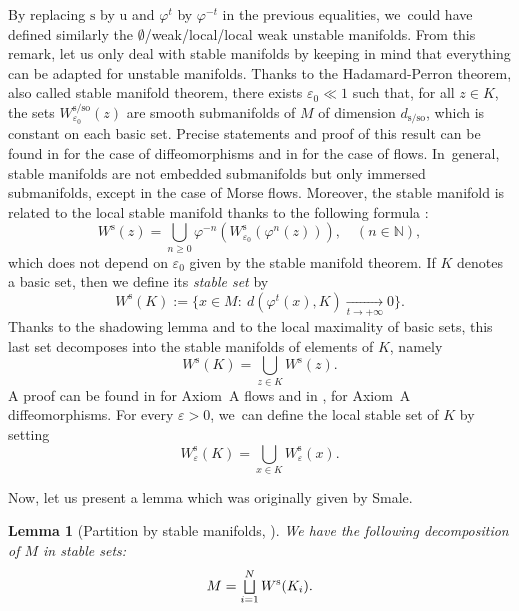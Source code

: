 \documentclass[JEP,XML,SOM,Unicode,NoEqCountersInSection,NoFloatCountersInSection,published]{cedram}
\let\oldbigsqcup\bigsqcup
\renewcommand{\bigsqcup}{\mathop{\textstyle\oldbigsqcup}\displaylimits}
\newcommand{\rs}{\mathrm{s}}
\newcommand{\rso}{\mathrm{so}}
\newcommand{\ru}{\mathrm{u}}
\theoremstyle{definition}
\theoremstyle{plain}
\newtheorem{lemma}[definition]{Lemma}
\newcommand{\N}{\mathbb{N}}
\begin{document}
By replacing $\rs$ by $\ru$ and $\varphi^t$ by $\varphi^{-t}$ in the previous equalities, we~could have defined similarly the $\emptyset$/weak/local/local weak unstable manifolds. From this remark, let us only deal with stable manifolds by keeping in mind that everything can be adapted for unstable manifolds. Thanks to the Hadamard-Perron theorem, also called stable manifold theorem, there exists $\varepsilon_0 \ll 1$ such that, for all $z \in K$, the sets $W_{\varepsilon_0}^{\rs/\rso} (z)$ are smooth submanifolds of $M$ of dimension $d_{\rs/\rso}$, which is constant on each basic set. Precise statements and proof of this result can be found in \cite[Th.\,6.4.9, p.\,267]{katok-hasselblatt} for the case of diffeomorphisms and in \cite[Th.\,5, p.\,34]{dyatlov} for the case of flows. In~general, stable manifolds are not embedded submanifolds but only immersed submanifolds, except in the case of Morse flows. Moreover, the stable manifold is related to the local stable manifold thanks to the following formula \cite[p.\,24]{dyatlov}:
\[
W^\rs (z) = \bigcup_{n \geq 0} \varphi^{-n} \left(W_{\varepsilon_0}^\rs (\varphi^{n} (z)) \right), \quad (n \in \N),
\]
which does not depend on $\varepsilon_0$ given by the stable manifold theorem. If $K$ denotes a basic set, then we define its \textit{stable set} by
\[
W^{\rs} (K):= \{ x \in M: \: d(\varphi^{ t} (x), K) \underset{t \to +\infty}{\to} 0 \}.
\]
Thanks to the shadowing lemma \cite[Th.\,18.1.6 p.\,569]{katok-hasselblatt} and to the local maximality of basic sets, this last set decomposes into the stable manifolds of elements of $K$, namely
\[
W^\rs (K) = \bigcup_{z \in K} W^\rs (z).
\]
A proof can be found in \cite[Th.\,5.3.25]{FH} for Axiom~A flows and in \cite[Prop.\,3.10, p.\,53]{bowen3}, \cite[Th.\,6.26, p.\,131]{wen} for Axiom~A diffeomorphisms. For every $\varepsilon >0$, we~can define the local stable set of $K$ by setting
\begin{equation}\label{eq: local decomposition of the stable manifold of a basic set}
W_{\varepsilon}^\rs (K) = \bigcup_{x \in K} W_{\varepsilon}^\rs (x).
\end{equation}

Now, let us present a lemma which was originally given by Smale.

\begin{lemma}[{Partition by stable manifolds, \cite[Cor.\,II.5.3]{smale} }]\label{lemma: spectral decomposition of the manifold} We have the following decomposition of $M$ in stable sets:
\begin{equation} \label{partition of the manifold in stable manifolds}
M = \bigsqcup_{i = 1}^N W^\rs (K_i).
\end{equation}
\end{lemma}
\end{document}

